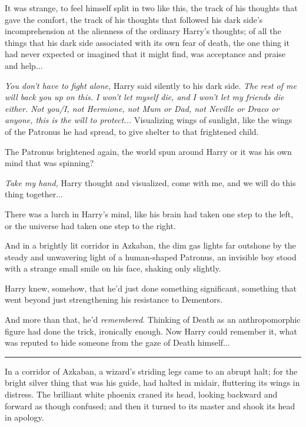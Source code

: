 It was strange, to feel himself split in two like this, the track of his thoughts that gave the comfort, the track of his thoughts that followed his dark side's incomprehension at the alienness of the ordinary Harry's thoughts; of all the things that his dark side associated with its own fear of death, the one thing it had never expected or imagined that it might find, was acceptance and praise and help...

\emph{You don't have to fight alone,} Harry said silently to his dark side. \emph{The rest of me will back you up on this. I won't let myself die, and I won't let my friends die either. Not you/I, not Hermione, not Mum or Dad, not Neville or Draco or anyone, this is the will to protect...} Visualizing wings of sunlight, like the wings of the Patronus he had spread, to give shelter to that frightened child.

The Patronus brightened again, the world spun around Harry or it was his own mind that was spinning?

\emph{Take my hand,} Harry thought and visualized, come with me, and we will do this thing together...

There was a lurch in Harry's mind, like his brain had taken one step to the left, or the universe had taken one step to the right.

And in a brightly lit corridor in Azkaban, the dim gas lights far outshone by the steady and unwavering light of a human-shaped Patronus, an invisible boy stood with a strange small smile on his face, shaking only slightly.

Harry knew, somehow, that he'd just done something significant, something that went beyond just strengthening his resistance to Dementors.

And more than that, he'd \emph{remembered}. Thinking of Death as an anthropomorphic figure had done the trick, ironically enough. Now Harry could remember it, what was reputed to hide someone from the gaze of Death himself...

\begin{center}\rule{3in}{0.4pt}\end{center}

In a corridor of Azkaban, a wizard's striding legs came to an abrupt halt; for the bright silver thing that was his guide, had halted in midair, fluttering its wings in distress. The brilliant white phoenix craned its head, looking backward and forward as though confused; and then it turned to its master and shook its head in apology.

